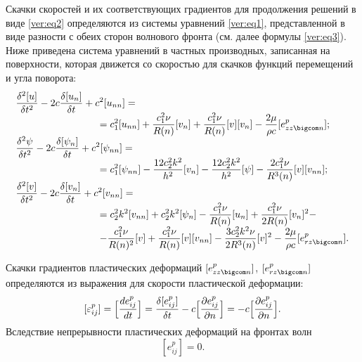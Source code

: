 Скачки скоростей и их соответствующих градиентов для продолжения решений в виде \eqref{ver:eq2} определяются из системы уравнений \eqref{ver:eq1}, представленной в виде разности с обеих сторон волнового фронта (см. далее формулы \eqref{ver:eq3}). Ниже приведена система уравнений в частных производных, записанная на поверхности, которая движется со скоростью   для скачков функций перемещений и угла поворота:
\begin{equation}
\label{ver:eq3}
\begin{array}{l}
\displaystyle
\frac{\delta^2[u]}{\delta t^2}-2c\frac{\delta[u_n]}{\delta t}+c^2[u_{nn}]= \\
\displaystyle \hspace{3cm}
= c_1^2 [u_{nn}]+\frac{c_1^2\nu}{R(n)}[v_n]+\frac{c_1^2\nu}{R(n)}[v][v_n]-\frac{2\mu}{\rho c} [e^p_{zz\bigcom n}];
\\[2mm]
\displaystyle
\frac{\delta^2\psi}{\delta t^2}-2c\frac{\delta[\psi_n]}{\delta t}+c^2 [\psi_{nn}] =\\
\displaystyle \hspace{3cm}
 =c_1^2[\psi_{nn}]-\frac{12c_2^2k^2}{h^2}[v_n]-\frac{12c_2^2k^2}{h^2}[\psi]-\frac{2c_1^2\nu}{R^3(n)}[v][v_{nn}];
\\[2mm]
\displaystyle 
\frac{\delta ^2 [v]}{\delta t^2}-2 c \frac{\delta [v_n]}{\delta t}+c^2 [v_{nn}]= 
\\
\displaystyle \hspace{3cm}
=c_2^2k^2 [v_{nn}]+c_2^2k^2 [\psi_n]-\frac{c_1^2\nu}{R(n)}[u_n]+\frac{c_1^2\nu}{2R(n)}[v_n]^2-
\\
\displaystyle \hspace{3cm}
-\frac{c_1^2\nu}{R(n)^2}[v]+\frac{c_1^2\nu}{R(n)}[v][v_{nn}]-\frac{3c_2^2k^2\nu}{2R^3(n)}[v]^2-\frac{2 \mu}{\rho c} [e^p_{rz\bigcom n}].
\end{array}
\end{equation}

Скачки градиентов пластических деформаций $[e^p_{zz\bigcom n}]$, $[e^p_{rz\bigcom n}]$ определяются из выражения для скорости пластической деформации:
\begin{equation}
\label{ver:eq4}
[\varepsilon^p_{ij}]=\Bigl[\frac{de^p_{ij}}{dt}\Bigr]=
\frac{\delta[e^p_{ij}]}{\delta t}-c\Bigl[\frac{\partial e_{ij}^p}{\partial n}\Bigr]=
-c\Bigl[\frac{\partial e_{ij}^p}{\partial n}\Bigr].
\end{equation}
Вследствие непрерывности пластических деформаций на фронтах волн $${[e^p_{ij}]=0}.$$

